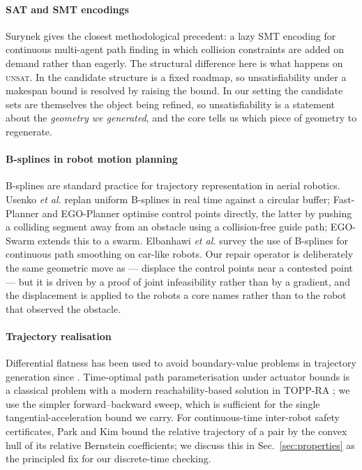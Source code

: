 \documentclass[conference]{IEEEtran}
\begin{document}
\paragraph*{SAT and SMT encodings}
Surynek \cite{surynek2020} gives the closest methodological precedent: a lazy SMT encoding
for continuous multi-agent path finding in which collision constraints are added on demand
rather than eagerly. The structural difference here is what happens on
\textsc{unsat}. In \cite{surynek2020} the candidate structure is a fixed roadmap, so
unsatisfiability under a makespan bound is resolved by raising the bound. In our setting the
candidate sets are themselves the object being refined, so unsatisfiability is a statement
about the \emph{geometry we generated}, and the core tells us which piece of geometry to
regenerate.

\paragraph*{B-splines in robot motion planning}
B-splines are standard practice for trajectory representation in aerial robotics. Usenko
\emph{et al.} \cite{usenko2017} replan uniform B-splines in real time against a circular
buffer; Fast-Planner \cite{fastplanner2019} and EGO-Planner \cite{egoplanner2021} optimise
control points directly, the latter by pushing a colliding segment away from an obstacle
using a collision-free guide path; EGO-Swarm \cite{egoswarm2021} extends this to a swarm.
Elbanhawi \emph{et al.} \cite{elbanhawi2015} survey the use of B-splines for continuous
path smoothing on car-like robots. Our repair operator is deliberately the same geometric
move as \cite{egoplanner2021} --- displace the control points near a contested point --- but
it is driven by a proof of joint infeasibility rather than by a gradient, and the
displacement is applied to the robots a core names rather than to the robot that observed
the obstacle.

\paragraph*{Trajectory realisation}
Differential flatness has been used to avoid boundary-value problems in trajectory
generation since \cite{mellinger2011}. Time-optimal path parameterisation under actuator
bounds is a classical problem with a modern reachability-based solution in TOPP-RA
\cite{toppra2018}; we use the simpler forward--backward sweep, which is sufficient for the
single tangential-acceleration bound we carry. For continuous-time inter-robot safety
certificates, Park and Kim \cite{parkkim2020} bound the relative trajectory of a pair by
the convex hull of its relative Bernstein coefficients; we discuss this in
Sec.~\ref{sec:properties} as the principled fix for our discrete-time checking.
\end{document}
